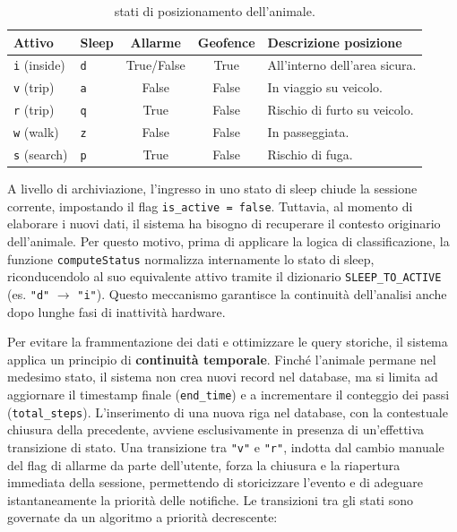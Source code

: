 \documentclass[12pt,a4paper]{article}
\begin{document}
\begin{table}[H]
\centering
\small
\begin{tabularx}{\textwidth}{m{2.3cm}m{2.1cm}ccX}
\toprule
\textbf{Attivo} & \textbf{Sleep} & \textbf{Allarme} & \textbf{Geofence} & \textbf{Descrizione posizione}                   \\ \midrule
\texttt{i} (inside)   & \texttt{d}           & True/False              & True              & All'interno dell'area sicura. \\
\texttt{v} (trip)  & \texttt{a}           & False                   & False             & In viaggio su veicolo.        \\ 
\texttt{r} (trip)   & \texttt{q}           & True                    & False             & Rischio di furto su veicolo.  \\
\texttt{w} (walk)     & \texttt{z}           & False                   & False             & In passeggiata.               \\
\texttt{s} (search)   & \texttt{p}           & True                    & False             & Rischio di fuga.              \\ \bottomrule
\end{tabularx}
\caption{stati di posizionamento dell'animale.}
\label{tab:stati}
\end{table}

A livello di archiviazione, l'ingresso in uno stato di sleep chiude la sessione corrente, 
impostando il flag \texttt{is\_active = false}. 
Tuttavia, al momento di elaborare i nuovi dati, il sistema ha bisogno di recuperare il contesto originario dell'animale. 
Per questo motivo, prima di applicare la logica di classificazione, la funzione \texttt{computeStatus} 
normalizza internamente lo stato di sleep, riconducendolo al suo equivalente attivo 
tramite il dizionario \texttt{SLEEP\_TO\_ACTIVE} (es. \texttt{"d"} $\rightarrow$ \texttt{"i"}). 
Questo meccanismo garantisce la continuità dell'analisi anche dopo lunghe fasi di inattività hardware. 

Per evitare la frammentazione dei dati e ottimizzare le query storiche, 
il sistema applica un principio di \textbf{continuità temporale}.
Finché l'animale permane nel medesimo stato, 
il sistema non crea nuovi record nel database, 
ma si limita ad aggiornare il timestamp finale (\texttt{end\_time})
e a incrementare il conteggio dei passi (\texttt{total\_steps}). 
L'inserimento di una nuova riga nel database, con la contestuale chiusura della precedente,
avviene esclusivamente in presenza di un'effettiva transizione di stato. 
Una transizione tra \texttt{"v"} e \texttt{"r"}, indotta dal cambio manuale del flag di allarme
da parte dell'utente, forza la chiusura e la riapertura immediata della sessione, 
permettendo di storicizzare l'evento e di adeguare istantaneamente la priorità delle notifiche.
Le transizioni tra gli stati sono governate da un algoritmo a priorità decrescente:
\end{document}
